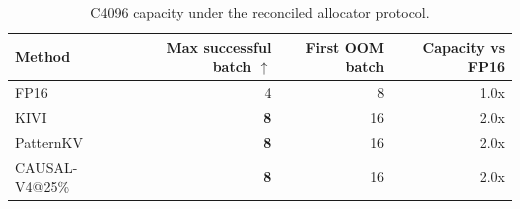 \begin{table}[t]
\centering
\small
\caption{C4096 capacity under the reconciled allocator protocol.}
\label{tab:capacity}
\begin{tabular}{lrrr}
\toprule
Method & Max successful batch $\uparrow$ & First OOM batch & Capacity vs FP16 \\
\midrule
FP16 & 4 & 8 & 1.0x \\
KIVI & \textbf{8} & 16 & 2.0x \\
PatternKV & \textbf{8} & 16 & 2.0x \\
CAUSAL-V4@25\% & \textbf{8} & 16 & 2.0x \\
\bottomrule
\end{tabular}
\end{table}
